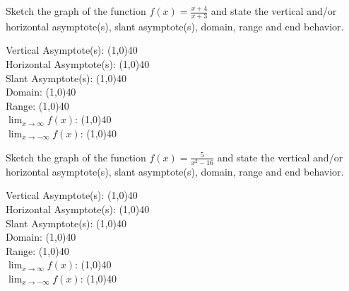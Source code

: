 \documentclass[addpoints]{exam}
\begin{document}
\begin{questions}
    \newpage
    \question[1] Sketch the graph of the function $f(x) = \frac{x+4}{x+3}$ and state the vertical and/or horizontal asymptote(s), slant asymptote(s), domain, range and end behavior.
    
        \begin{left} 
        \end{left}
    
    Vertical Asymptote(s): \line(1,0){40} \\
    \newline
    Horizontal Asymptote(s): \line(1,0){40} \\
    \newline
    Slant Asymptote(s): \line(1,0){40} \\
    \newline
    Domain: \line(1,0){40} \\
    \newline
    Range: \line(1,0){40} \\
    \newline
    $\lim_{x\to\infty} f(x)$: \line(1,0){40} \\
    \newline
    $\lim_{x\to-\infty} f(x)$: \line(1,0){40} \\
    
    \question[1] Sketch the graph of the function $f(x) = \frac{5}{x^2 - 16}$ and state the vertical and/or horizontal asymptote(s), slant asymptote(s), domain, range and end behavior.
    
        \begin{left} 
        \end{left}
    
    Vertical Asymptote(s): \line(1,0){40} \\
    \newline
    Horizontal Asymptote(s): \line(1,0){40} \\
    \newline
    Slant Asymptote(s): \line(1,0){40} \\
    \newline
    Domain: \line(1,0){40} \\
    \newline
    Range: \line(1,0){40} \\
    \newline
    $\lim_{x\to\infty} f(x)$: \line(1,0){40} \\
    \newline
    $\lim_{x\to-\infty} f(x)$: \line(1,0){40} \\
    

\end{questions}
\end{document}
